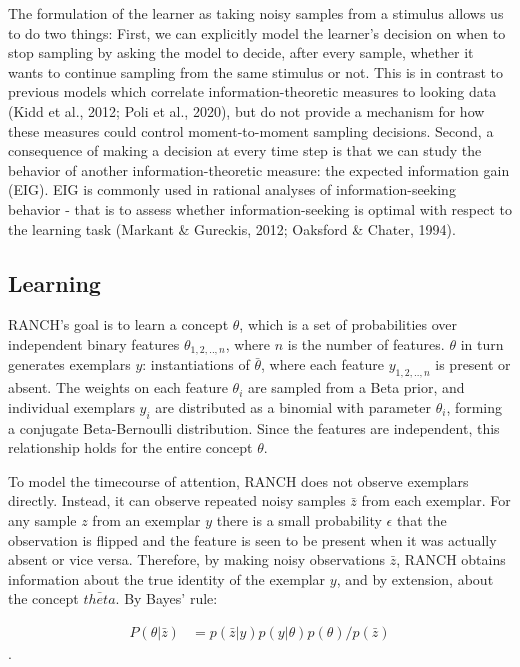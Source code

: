 \documentclass[10pt, letterpaper]{article}
\begin{document}
The formulation of the learner as taking noisy samples from a stimulus
allows us to do two things: First, we can explicitly model the learner's
decision on when to stop sampling by asking the model to decide, after
every sample, whether it wants to continue sampling from the same
stimulus or not. This is in contrast to previous models which correlate
information-theoretic measures to looking data (Kidd et al., 2012; Poli
et al., 2020), but do not provide a mechanism for how these measures
could control moment-to-moment sampling decisions. Second, a consequence
of making a decision at every time step is that we can study the
behavior of another information-theoretic measure: the expected
information gain (EIG). EIG is commonly used in rational analyses of
information-seeking behavior - that is to assess whether
information-seeking is optimal with respect to the learning task
(Markant \& Gureckis, 2012; Oaksford \& Chater, 1994).

\hypertarget{learning}{%
\subsection{Learning}\label{learning}}

RANCH's goal is to learn a concept \(\theta\), which is a set of
probabilities over independent binary features \(\theta_{1,2,..,n}\),
where \(n\) is the number of features. \(\theta\) in turn generates
exemplars \(y\): instantiations of \(\bar{\theta}\), where each feature
\(y_{1,2,..,n}\) is present or absent. The weights on each feature
\(\theta_i\) are sampled from a Beta prior, and individual exemplars
\(y_i\) are distributed as a binomial with parameter \(\theta_i\),
forming a conjugate Beta-Bernoulli distribution. Since the features are
independent, this relationship holds for the entire concept \(\theta\).

To model the timecourse of attention, RANCH does not observe exemplars
directly. Instead, it can observe repeated noisy samples \(\bar{z}\)
from each exemplar. For any sample \(z\) from an exemplar \(y\) there is
a small probability \(\epsilon\) that the observation is flipped and the
feature is seen to be present when it was actually absent or vice versa.
Therefore, by making noisy observations \(\bar{z}\), RANCH obtains
information about the true identity of the exemplar \(y\), and by
extension, about the concept \(\bar{theta}\). By Bayes' rule:

\begin{eqnarray}
P(\theta|\bar{z}) &= p(\bar{z}|y) p(y|\theta) p(\theta) / p(\bar{z})
\end{eqnarray}.
\end{document}
